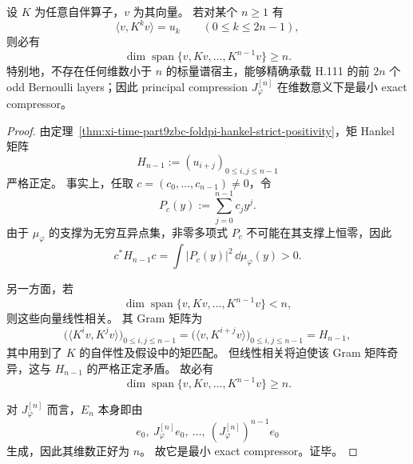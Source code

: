 \begin{theorem}\label{thm:xi-time-part9zbi-minimal-exact-compressor}
设 \(K\) 为任意自伴算子，\(v\) 为其向量。
若对某个 \(n\ge 1\) 有
\[
\langle v,K^k v\rangle=u_k
\qquad (0\le k\le 2n-1),
\]
则必有
\[
\dim \operatorname{span}\{v,Kv,\dots,K^{n-1}v\}\ge n.
\]
特别地，不存在任何维数小于 \(n\) 的标量谱宿主，能够精确承载 H.111 的前 \(2n\) 个 odd Bernoulli layers；因此 principal compression \(J_\varphi^{[n]}\) 在维数意义下是最小 exact compressor。
\end{theorem}
\begin{proof}
由定理~\ref{thm:xi-time-part9zbc-foldpi-hankel-strict-positivity}，矩 Hankel 矩阵
\[
H_{n-1}:=(u_{i+j})_{0\le i,j\le n-1}
\]
严格正定。
事实上，任取 \(c=(c_0,\dots,c_{n-1})\neq 0\)，令
\[
P_c(y):=\sum_{j=0}^{n-1}c_j y^j.
\]
由于 \(\mu_\varphi\) 的支撑为无穷互异点集，非零多项式 \(P_c\) 不可能在其支撑上恒零，因此
\[
c^\ast H_{n-1}c
=
\int |P_c(y)|^2\,\dd\mu_\varphi(y)>0.
\]

另一方面，若
\[
\dim \operatorname{span}\{v,Kv,\dots,K^{n-1}v\}<n,
\]
则这些向量线性相关。
其 Gram 矩阵为
\[
\bigl(\langle K^i v,K^j v\rangle\bigr)_{0\le i,j\le n-1}
=
\bigl(\langle v,K^{i+j}v\rangle\bigr)_{0\le i,j\le n-1}
=
H_{n-1},
\]
其中用到了 \(K\) 的自伴性及假设中的矩匹配。
但线性相关将迫使该 Gram 矩阵奇异，这与 \(H_{n-1}\) 的严格正定矛盾。
故必有
\[
\dim \operatorname{span}\{v,Kv,\dots,K^{n-1}v\}\ge n.
\]

对 \(J_\varphi^{[n]}\) 而言，\(E_n\) 本身即由
\[
e_0,\ J_\varphi^{[n]}e_0,\ \dots,\ (J_\varphi^{[n]})^{n-1}e_0
\]
生成，因此其维数正好为 \(n\)。
故它是最小 exact compressor。证毕。
\end{proof}

